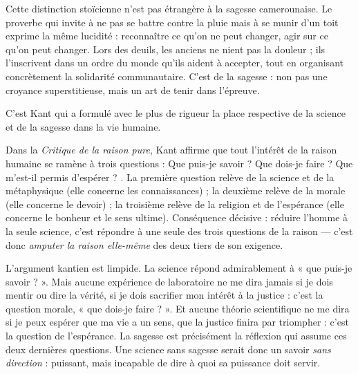 \documentclass[11pt]{article}
\newcounter{popsec}
\newcounter{popsub}
\newcommand{\courssub}[1]{%
  \stepcounter{popsub}%
  \par\vspace{9pt}\noindent{\popxbold\fontsize{11.5}{13}\selectfont\color{popink}{\color{poporange}\thepopsec.\thepopsub}\hspace{6pt}#1}\par\nopagebreak\vspace{4pt}
}
\begin{document}
\begin{exemplebox}
Cette distinction stoïcienne n'est pas étrangère à la sagesse camerounaise. Le proverbe qui invite à ne pas se battre contre la pluie mais à se munir d'un toit exprime la même lucidité : reconnaître ce qu'on ne peut changer, agir sur ce qu'on peut changer. Lors des deuils, les anciens ne nient pas la douleur ; ils l'inscrivent dans un ordre du monde qu'ils aident à accepter, tout en organisant concrètement la solidarité communautaire. C'est de la sagesse : non pas une croyance superstitieuse, mais un art de tenir dans l'épreuve.
\end{exemplebox}

\courssub{Kant : les trois questions de la raison}

C'est Kant qui a formulé avec le plus de rigueur la place respective de la science et de la sagesse dans la vie humaine.

\begin{propriete}
Dans la \emph{Critique de la raison pure}, Kant affirme que tout l'intérêt de la raison humaine se ramène à trois questions : \guillemotleft Que puis-je savoir ? Que dois-je faire ? Que m'est-il permis d'espérer ? \guillemotright. La première question relève de la science et de la métaphysique (elle concerne les connaissances) ; la deuxième relève de la morale (elle concerne le devoir) ; la troisième relève de la religion et de l'espérance (elle concerne le bonheur et le sens ultime). Conséquence décisive : réduire l'homme à la seule science, c'est répondre à une seule des trois questions de la raison — c'est donc \emph{amputer la raison elle-même} des deux tiers de son exigence.
\end{propriete}

L'argument kantien est limpide. La science répond admirablement à « que puis-je savoir ? ». Mais aucune expérience de laboratoire ne me dira jamais si je dois mentir ou dire la vérité, si je dois sacrifier mon intérêt à la justice : c'est la question morale, « que dois-je faire ? ». Et aucune théorie scientifique ne me dira si je peux espérer que ma vie a un sens, que la justice finira par triompher : c'est la question de l'espérance. La sagesse est précisément la réflexion qui assume ces deux dernières questions. Une science sans sagesse serait donc un savoir \emph{sans direction} : puissant, mais incapable de dire à quoi sa puissance doit servir.
\end{document}
